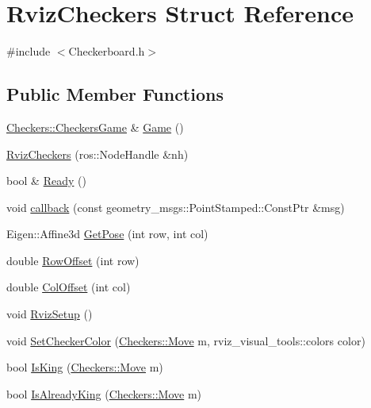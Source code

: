 \hypertarget{structRvizCheckers}{\section{Rviz\-Checkers Struct Reference}
\label{structRvizCheckers}
}


{\ttfamily \#include $<$Checkerboard.\-h$>$}

\subsection*{Public Member Functions}
\begin{DoxyCompactItemize}
\item 
\hyperlink{structCheckers_1_1CheckersGame}{Checkers\-::\-Checkers\-Game} \& \hyperlink{structRvizCheckers_a31e53b9767a998d9bedd20998b5561ea}{Game} ()
\item 
\hyperlink{structRvizCheckers_a95baf9992cfeb3a3b874f147d2f3fe9d}{Rviz\-Checkers} (ros\-::\-Node\-Handle \&nh)
\item 
bool \& \hyperlink{structRvizCheckers_aa746d281199f9bf58ed7ef9325952e0b}{Ready} ()
\item 
void \hyperlink{structRvizCheckers_a4187bc58341cc86e3e8e0e8ffaf5d871}{callback} (const geometry\-\_\-msgs\-::\-Point\-Stamped\-::\-Const\-Ptr \&msg)
\item 
Eigen\-::\-Affine3d \hyperlink{structRvizCheckers_a2c48b30955cf52732df361bdea20a398}{Get\-Pose} (int row, int col)
\item 
double \hyperlink{structRvizCheckers_a2df1c2f1d7d4e279a507580dbc2a6dd4}{Row\-Offset} (int row)
\item 
double \hyperlink{structRvizCheckers_ae842a9dcbab4dbe573e14c114c3ffb0e}{Col\-Offset} (int col)
\item 
void \hyperlink{structRvizCheckers_a302d65fdf74e1c16df74c2aa8fc93197}{Rviz\-Setup} ()
\item 
void \hyperlink{structRvizCheckers_a19a88dafb8e2d58297635ca3115d04b7}{Set\-Checker\-Color} (\hyperlink{structCheckers_1_1Move}{Checkers\-::\-Move} m, rviz\-\_\-visual\-\_\-tools\-::colors color)
\item 
bool \hyperlink{structRvizCheckers_a8ea898a813fa22eac273d90b8f0e54d3}{Is\-King} (\hyperlink{structCheckers_1_1Move}{Checkers\-::\-Move} m)
\item 
bool \hyperlink{structRvizCheckers_a21f23e0708801d2f879f7a4112b4b770}{Is\-Already\-King} (\hyperlink{structCheckers_1_1Move}{Checkers\-::\-Move} m)
\item 

\end{DoxyCompactItemize}
